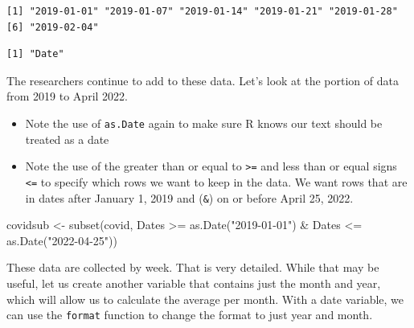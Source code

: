 \documentclass[
  letterpaper,
  DIV=11,
  numbers=noendperiod]{scrreprt}
\newenvironment{Shaded}{\begin{snugshade}}{\end{snugshade}}
\newcommand{\FunctionTok}[1]{\textcolor[rgb]{0.28,0.35,0.67}{#1}}
\newcommand{\NormalTok}[1]{\textcolor[rgb]{0.00,0.23,0.31}{#1}}
\newcommand{\OtherTok}[1]{\textcolor[rgb]{0.00,0.23,0.31}{#1}}
\newcommand{\SpecialCharTok}[1]{\textcolor[rgb]{0.37,0.37,0.37}{#1}}
\newcommand{\StringTok}[1]{\textcolor[rgb]{0.13,0.47,0.30}{#1}}
\providecommand{\tightlist}{%
  \setlength{\itemsep}{0pt}\setlength{\parskip}{0pt}}\usepackage{longtable,booktabs,array}
\begin{document}
\begin{verbatim}
[1] "2019-01-01" "2019-01-07" "2019-01-14" "2019-01-21" "2019-01-28"
[6] "2019-02-04"
\end{verbatim}

\begin{Shaded}
\end{Shaded}

\begin{verbatim}
[1] "Date"
\end{verbatim}

The researchers continue to add to these data. Let's look at the portion
of data from 2019 to April 2022.

\begin{itemize}
\tightlist
\item
  Note the use of \texttt{as.Date} again to make sure R knows our text
  should be treated as a date
\item
  Note the use of the greater than or equal to \texttt{\textgreater{}=}
  and less than or equal signs \texttt{\textless{}=} to specify which
  rows we want to keep in the data. We want rows that are in dates after
  January 1, 2019 and (\texttt{\&}) on or before April 25, 2022.
\end{itemize}

\begin{Shaded}
\begin{Highlighting}[]
\NormalTok{covidsub }\OtherTok{\textless{}{-}} \FunctionTok{subset}\NormalTok{(covid, Dates }\SpecialCharTok{\textgreater{}=} \FunctionTok{as.Date}\NormalTok{(}\StringTok{"2019{-}01{-}01"}\NormalTok{) }\SpecialCharTok{\&}
\NormalTok{                     Dates }\SpecialCharTok{\textless{}=} \FunctionTok{as.Date}\NormalTok{(}\StringTok{"2022{-}04{-}25"}\NormalTok{))}
\end{Highlighting}
\end{Shaded}

These data are collected by week. That is very detailed. While that may
be useful, let us create another variable that contains just the month
and year, which will allow us to calculate the average per month. With a
date variable, we can use the \texttt{format} function to change the
format to just year and month.

\begin{Shaded}
\end{Shaded}
\end{document}
